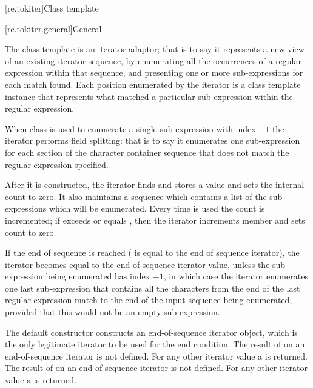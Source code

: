 [re.tokiter]{Class template }

[re.tokiter.general]{General}

\pnum
{}%
The class template  is an iterator adaptor; that
is to say it represents a new view of an existing iterator sequence,
by enumerating all the occurrences of a regular expression within that
sequence, and presenting one or more sub-expressions for each match
found. Each position enumerated by the iterator is a  class
template instance that represents what matched a particular sub-expression
within the regular expression.

\pnum
When class  is used to enumerate a
single sub-expression with index $-1$ the iterator performs field
splitting: that is to say it enumerates one sub-expression for each section of
the character container sequence that does not match the regular
expression specified.

\pnum
{}%
After it is constructed, the iterator finds and stores a value
and sets the internal count  to zero. It also maintains a sequence
 which contains a list of the sub-expressions which will be
enumerated. Every time  is used
the count  is incremented; if  exceeds or equals ,
then the iterator increments member 
and sets count  to zero.

\pnum
If the end of sequence is reached ( is equal to the end of
sequence iterator), the iterator becomes equal to the end-of-sequence
iterator value, unless the sub-expression being enumerated has index $-1$,
in which case the iterator enumerates one last sub-expression that contains
all the characters from the end of the last regular expression match to the
end of the input sequence being enumerated, provided that this would not be an
empty sub-expression.

\pnum
{}%
The default constructor constructs
an end-of-sequence iterator object, which is the only legitimate
iterator to be used for the end condition. The result of  on
an end-of-sequence iterator is not defined. For any other iterator value a
 is returned.
The result of  on an end-of-sequence iterator
is not defined. For any other iterator value a  is returned.

